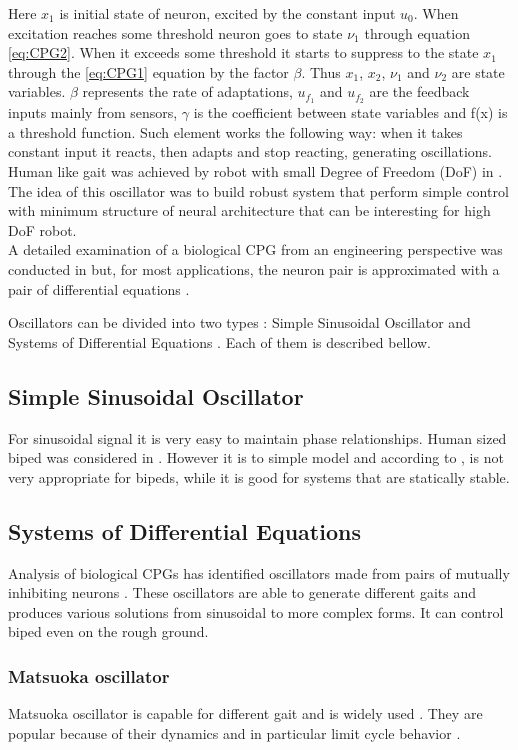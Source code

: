 \documentclass[12pt,a4paper]{report}
\begin{document}
		Here $x_1$  is initial state of neuron, excited by the constant input $u_0$. When excitation reaches some threshold neuron goes to state $\nu_1$ through equation \ref{eq:CPG2}. When it exceeds some threshold it starts to suppress to the state $x_1$ through the \ref{eq:CPG1} equation by the factor $\beta$. Thus $x_1$, $x_2$, $\nu_1$ and $\nu_2$ are state variables. $\beta$ represents the rate of adaptations, $u_{f_1}$ and $u_{f_2}$ are the feedback inputs mainly from sensors, $\gamma$ is the coefficient between state variables and f(x) is a threshold function. Such element works the following way: when it takes constant input it reacts, then adapts and stop reacting, generating oscillations. \\ Human like gait was achieved by robot with small Degree of Freedom (DoF) in \cite{miyakoshi1998three}. The idea of this oscillator was to build robust system that perform simple control with minimum structure of neural architecture that can be interesting for high DoF robot.\\
		A detailed examination of a biological CPG from an engineering perspective was conducted in \cite{zhu2006central} but, for most applications, the neuron pair is approximated with a pair of differential equations \cite{wright2014intelligent}.

		Oscillators can be divided into two types : Simple Sinusoidal Oscillator and Systems of Differential Equations \cite{wright2014intelligent}. Each of them is described bellow.

		\subsection{Simple Sinusoidal Oscillator}
			For sinusoidal signal it is very easy to maintain phase relationships. Human sized biped was considered in \cite{morimoto2008biologically}. However it is to simple model and according to \cite{wright2014intelligent}, is not very appropriate for bipeds, while it is good for systems that are statically stable. 
		\subsection{Systems of Differential Equations}
			Analysis of biological CPGs has identified oscillators made from pairs of mutually inhibiting neurons \cite{grillner1995neural}. These oscillators are able to generate different gaits and produces various solutions from sinusoidal to more complex forms. It can control biped even on the rough ground.
			\subsubsection{Matsuoka oscillator}
				Matsuoka oscillator is capable for different gait and is widely used \cite{wright2014intelligent}. They are popular because of their dynamics and in particular limit cycle behavior \cite{matsuoka1985sustained}.
				
\end{document}
